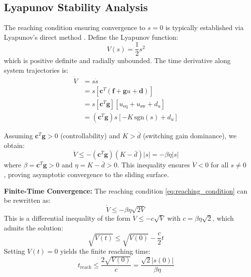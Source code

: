 \subsection{Lyapunov Stability Analysis}

The reaching condition ensuring convergence to $s = 0$ is typically established via Lyapunov's direct method \cite{khalil2002nonlinear}. Define the Lyapunov function:
\begin{equation}
V(s) = \frac{1}{2} s^2
\label{eq:lyapunov_function}
\end{equation}
which is positive definite and radially unbounded. The time derivative along system trajectories is:
\begin{align}
\dot{V} &= s \dot{s} \nonumber \\
&= s [\mathbf{c}^T (\mathbf{f} + \mathbf{g} u + \mathbf{d})] \nonumber \\
&= s [\mathbf{c}^T \mathbf{g}] [u_{\text{eq}} + u_{\text{sw}} + d_u] \nonumber \\
&= (\mathbf{c}^T \mathbf{g}) s [-K \, \text{sgn}(s) + d_u] \label{eq:lyapunov_derivative}
\end{align}

Assuming $\mathbf{c}^T \mathbf{g} > 0$ (controllability) and $K > \bar{d}$ (switching gain dominance), we obtain:
\begin{equation}
\dot{V} \leq -(\mathbf{c}^T \mathbf{g})(K - \bar{d}) |s| = -\beta \eta |s|
\label{eq:reaching_condition}
\end{equation}
where $\beta = \mathbf{c}^T \mathbf{g} > 0$ and $\eta = K - \bar{d} > 0$. This inequality ensures $\dot{V} < 0$ for all $s \neq 0$, proving asymptotic convergence to the sliding surface.

\textbf{Finite-Time Convergence:} The reaching condition \eqref{eq:reaching_condition} can be rewritten as:
\begin{equation}
\dot{V} \leq -\beta \eta \sqrt{2V}
\label{eq:finite_time_inequality}
\end{equation}
This is a differential inequality of the form $\dot{V} \leq -c \sqrt{V}$ with $c = \beta \eta \sqrt{2}$, which admits the solution:
\begin{equation}
\sqrt{V(t)} \leq \sqrt{V(0)} - \frac{c}{2} t
\label{eq:finite_time_solution}
\end{equation}
Setting $V(t) = 0$ yields the finite reaching time:
\begin{equation}
t_{\text{reach}} \leq \frac{2\sqrt{V(0)}}{c} = \frac{\sqrt{2} |s(0)|}{\beta \eta}
\label{eq:reaching_time}
\end{equation}


